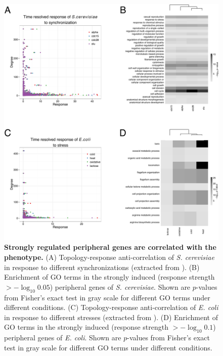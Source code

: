 \begin{figure}[!ht]
\begin{center}
\includegraphics[width=\textwidth]{yeast_ecoli_go.pdf}
\end{center}
\caption[GO term enrichment of strongly regulated genes]{
{\bf Strongly regulated peripheral genes are correlated with the phenotype.}
(A) Topology-response
anti-correlation of \emph{S. cerevisiae} in response to different synchronizations
(extracted from \citealp{Spellman1998,Cho1998}). 
(B) Enrichment of GO
terms in the strongly induced (response strength $> -\log_{10}0.05$) 
peripheral genes of \emph{S. cerevisiae}. Shown 
are $p$-values
from Fisher's exact test in gray scale for different GO terms under different 
conditions.
(C) Topology-response anti-correlation of \emph{E. coli} in response 
to different stresses (extracted from \citealp{Jozefczuk2010}). 
(D) Enrichment of GO terms
in the strongly induced (response strength $> -\log_{10}0.1$) 
peripheral genes of \emph{E. coli}. Shown are $p$-values
from Fisher's exact test in gray scale for different GO terms under different 
conditions. 
}
\label{fig:ecoli_yeast_go}
\end{figure}

